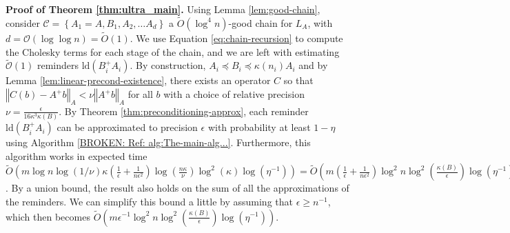 \textbf{Proof of Theorem \ref{thm:ultra_main}.} Using Lemma \ref{lem:good-chain},
consider $\mathcal{C}=\left\{ A_{1}=A,B_{1},A_{2},\dots A_{d}\right\} $
a $\tilde{O}\left(\log^{4}n\right)$-good chain for $L_{A}$, with
$d=\mathcal{O}\left(\log\log n\right)=\tilde{O}\left(1\right)$. We
use Equation \ref{eq:chain-recursion} to compute the Cholesky terms
for each stage of the chain, and we are left with estimating $\tilde{\mathcal{O}}\left(1\right)$
reminders $\text{ld}\left(B_{i}^{+}A_{i}\right)$. By construction,
$A_{i}\preceq B_{i}\preceq\kappa\left(n_{i}\right)A_{i}$ and by Lemma
\ref{lem:linear-precond-existence}, there exists an operator $C$
so that $\left\Vert C\left(b\right)-A^{+}b\right\Vert _{A}<\nu\left\Vert A^{+}b\right\Vert _{A}$
for all $b$ with a choice of relative precision $\nu=\frac{\epsilon}{16\kappa^{3}\kappa\left(B\right)}$.
By Theorem \ref{thm:preconditioning-approx}, each reminder $\text{ld}\left(B_{i}^{+}A_{i}\right)$
can be approximated to precision $\epsilon$ with probability at least
$1-\eta$ using Algorithm \ref{BROKEN: Ref: alg:The-main-alg...}.
Furthermore, this algorithm works in expected time $\tilde{O}\left(m\log n\log\left(1/\nu\right)\kappa\left(\frac{1}{\epsilon}+\frac{1}{n\epsilon^{2}}\right)\log\left(\frac{n\kappa}{\nu}\right)\log^{2}\left(\kappa\right)\log\left(\eta^{-1}\right)\right)=\tilde{O}\left(m\left(\frac{1}{\epsilon}+\frac{1}{n\epsilon^{2}}\right)\log^{2}n\log^{2}\left(\frac{\kappa\left(B\right)}{\epsilon}\right)\log\left(\eta^{-1}\right)\right)$.
By a union bound, the result also holds on the sum of all the approximations
of the reminders. We can simplify this bound a little by assuming
that $\epsilon\geq n^{-1}$, which then becomes $\tilde{O}\left(m\epsilon^{-1}\log^{2}n\log^{2}\left(\frac{\kappa\left(B\right)}{\epsilon}\right)\log\left(\eta^{-1}\right)\right)$. 

